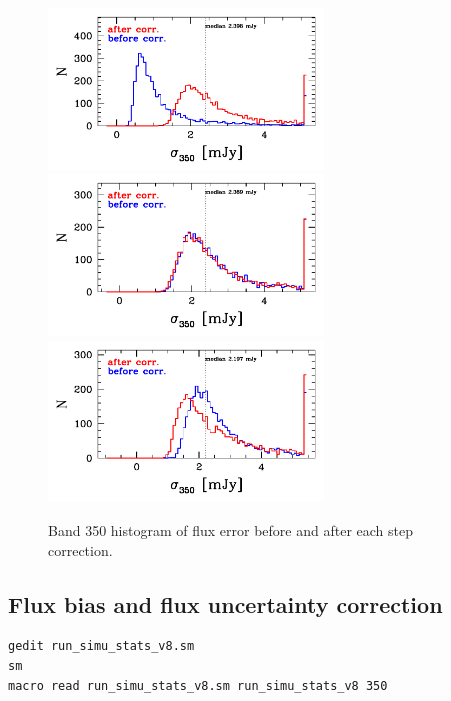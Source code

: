 \documentclass[11pt,a4paper]{article}
\begin{document}
\begin{figure}[H]
	\caption{
		Band 350 histogram of flux error before and after each step correction. 
	}
	\includegraphics[width=0.65\textwidth]{galsim_350_hist_uncertainty_1}
	\includegraphics[width=0.65\textwidth]{galsim_350_hist_uncertainty_2}
	\includegraphics[width=0.65\textwidth]{galsim_350_hist_uncertainty_3}
\end{figure}


\subsection{Flux bias and flux uncertainty correction}
\label{Band350_dfcorr}

\begin{lstlisting}[language=bash]
gedit run_simu_stats_v8.sm
sm
macro read run_simu_stats_v8.sm run_simu_stats_v8 350
\end{lstlisting}

\end{document}
